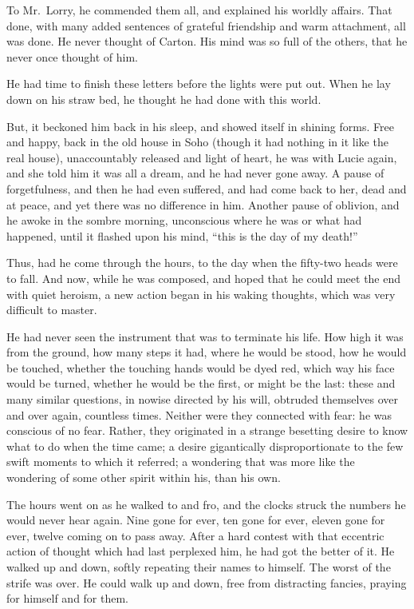 To Mr.\ Lorry, he commended them all, and explained his worldly affairs.
That done, with many added sentences of grateful friendship and warm
attachment, all was done.  He never thought of Carton.  His mind was
so full of the others, that he never once thought of him.

He had time to finish these letters before the lights were put out.
When he lay down on his straw bed, he thought he had done with this world.

But, it beckoned him back in his sleep, and showed itself in shining
forms.  Free and happy, back in the old house in Soho (though it had
nothing in it like the real house), unaccountably released and light
of heart, he was with Lucie again, and she told him it was all a dream,
and he had never gone away.  A pause of forgetfulness, and then he
had even suffered, and had come back to her, dead and at peace, and yet
there was no difference in him.  Another pause of oblivion, and he
awoke in the sombre morning, unconscious where he was or what had
happened, until it flashed upon his mind, ``this is the day of my death!''

Thus, had he come through the hours, to the day when the fifty-two
heads were to fall.  And now, while he was composed, and hoped that
he could meet the end with quiet heroism, a new action began in his
waking thoughts, which was very difficult to master.

He had never seen the instrument that was to terminate his life.
How high it was from the ground, how many steps it had, where he
would be stood, how he would be touched, whether the touching hands
would be dyed red, which way his face would be turned, whether he
would be the first, or might be the last:  these and many similar
questions, in nowise directed by his will, obtruded themselves over
and over again, countless times.  Neither were they connected with
fear:  he was conscious of no fear.  Rather, they originated in a
strange besetting desire to know what to do when the time came;
a desire gigantically disproportionate to the few swift moments to
which it referred; a wondering that was more like the wondering of
some other spirit within his, than his own.

The hours went on as he walked to and fro, and the clocks struck the
numbers he would never hear again.  Nine gone for ever, ten gone for
ever, eleven gone for ever, twelve coming on to pass away.  After a
hard contest with that eccentric action of thought which had last
perplexed him, he had got the better of it.  He walked up and down,
softly repeating their names to himself.  The worst of the strife was
over.  He could walk up and down, free from distracting fancies,
praying for himself and for them.

